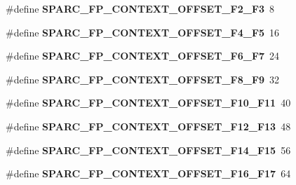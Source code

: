 \begin{DoxyCompactItemize}
\mbox{\label{group__RTEMSScoreCPUSPARC_ga963ae05e12f3d66bca97fb28cd539c6f}} 
\#define {\bfseries S\+P\+A\+R\+C\+\_\+\+F\+P\+\_\+\+C\+O\+N\+T\+E\+X\+T\+\_\+\+O\+F\+F\+S\+E\+T\+\_\+\+F2\+\_\+\+F3}~8
\item 
\mbox{\label{group__RTEMSScoreCPUSPARC_ga797474dc6b95322d5571db12db92fddc}} 
\#define {\bfseries S\+P\+A\+R\+C\+\_\+\+F\+P\+\_\+\+C\+O\+N\+T\+E\+X\+T\+\_\+\+O\+F\+F\+S\+E\+T\+\_\+\+F4\+\_\+\+F5}~16
\item 
\mbox{\label{group__RTEMSScoreCPUSPARC_ga0705dff4cff0a0b566bf2a0119a1bc12}} 
\#define {\bfseries S\+P\+A\+R\+C\+\_\+\+F\+P\+\_\+\+C\+O\+N\+T\+E\+X\+T\+\_\+\+O\+F\+F\+S\+E\+T\+\_\+\+F6\+\_\+\+F7}~24
\item 
\mbox{\label{group__RTEMSScoreCPUSPARC_ga0cfe71bdd950b9414f5f4be91150e722}} 
\#define {\bfseries S\+P\+A\+R\+C\+\_\+\+F\+P\+\_\+\+C\+O\+N\+T\+E\+X\+T\+\_\+\+O\+F\+F\+S\+E\+T\+\_\+\+F8\+\_\+\+F9}~32
\item 
\mbox{\label{group__RTEMSScoreCPUSPARC_ga728d01fa6657c3480852699101ca4939}} 
\#define {\bfseries S\+P\+A\+R\+C\+\_\+\+F\+P\+\_\+\+C\+O\+N\+T\+E\+X\+T\+\_\+\+O\+F\+F\+S\+E\+T\+\_\+\+F10\+\_\+\+F11}~40
\item 
\mbox{\label{group__RTEMSScoreCPUSPARC_gaf0149789b6536b1c6ba11c7b64936ed8}} 
\#define {\bfseries S\+P\+A\+R\+C\+\_\+\+F\+P\+\_\+\+C\+O\+N\+T\+E\+X\+T\+\_\+\+O\+F\+F\+S\+E\+T\+\_\+\+F12\+\_\+\+F13}~48
\item 
\mbox{\label{group__RTEMSScoreCPUSPARC_ga8e8fd90f8bb0e89706dc7dce6bd12848}} 
\#define {\bfseries S\+P\+A\+R\+C\+\_\+\+F\+P\+\_\+\+C\+O\+N\+T\+E\+X\+T\+\_\+\+O\+F\+F\+S\+E\+T\+\_\+\+F14\+\_\+\+F15}~56
\item 
\mbox{\label{group__RTEMSScoreCPUSPARC_gac6c8b1fe150e1f08365129062b8ceec4}} 
\#define {\bfseries S\+P\+A\+R\+C\+\_\+\+F\+P\+\_\+\+C\+O\+N\+T\+E\+X\+T\+\_\+\+O\+F\+F\+S\+E\+T\+\_\+\+F16\+\_\+\+F17}~64
\item 
\mbox{\label{group__RTEMSScoreCPUSPARC_ga5f0bdfadac72c6831457b2bc32cb5b86}} 

\end{DoxyCompactItemize}
